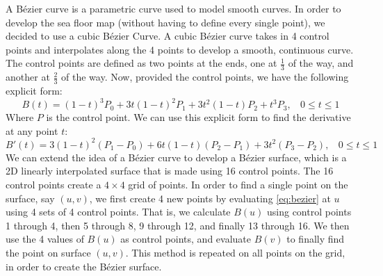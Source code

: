 \documentclass[../main.tex]{subfiles}
\begin{document}
A B\'ezier curve is a parametric curve used to model smooth curves.  In order to develop the sea floor map (without having to define every single point), we decided to use a cubic B\'ezier Curve.  A cubic B\'ezier curve takes in 4 control points and interpolates along the 4 points to develop a smooth, continuous curve.  The control points are defined as two points at the ends, one at $\frac{1}{3}$ of the way, and another at $\frac{2}{3}$ of the way.  Now, provided the control points, we have the following explicit form:
\begin{equation} \label{eq:bezier}
B(t) = (1-t)^3P_0 + 3t(1-t)^2P_1 + 3t^2(1-t)P_2+t^3P_3, \ \ \ \ 0\leq t \leq 1
\end{equation}
Where $P$ is the control point. We can use this explicit form to find the derivative at any point $t$:
\begin{equation}
B'(t) = 3(1-t)^2(P_1-P_0) + 6t(1-t)(P_2-P_1) + 3t^2(P_3-P_2), \ \ \ \ 0\leq t \leq 1
\end{equation}
We can extend the idea of a B\'ezier curve to develop a B\'ezier surface, which is a 2D linearly interpolated surface that is made using 16 control points. The 16 control points create a $4 \times 4$ grid of points.  In order to find a single point on the surface, say $(u, v)$, we first create 4 new points by evaluating \eqref{eq:bezier} at $u$ using 4 sets of 4 control points.  That is, we calculate $B(u)$ using control points 1 through 4, then 5 through 8, 9 through 12, and finally 13
through 16.  We then use the 4 values of $B(u)$ as control points, and evaluate $B(v)$ to finally find the point on surface $(u, v)$.  This method is repeated on all points on the grid, in order to create the B\'ezier surface. 
\end{document}

